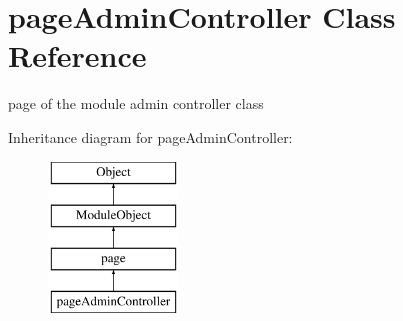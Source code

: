 \hypertarget{classpageAdminController}{}\section{page\+Admin\+Controller Class Reference}
\label{classpageAdminController}


page of the module admin controller class  


Inheritance diagram for page\+Admin\+Controller\+:\begin{figure}[H]
\begin{center}
\leavevmode
\includegraphics[height=4.000000cm]{classpageAdminController}
\end{center}
\end{figure}
